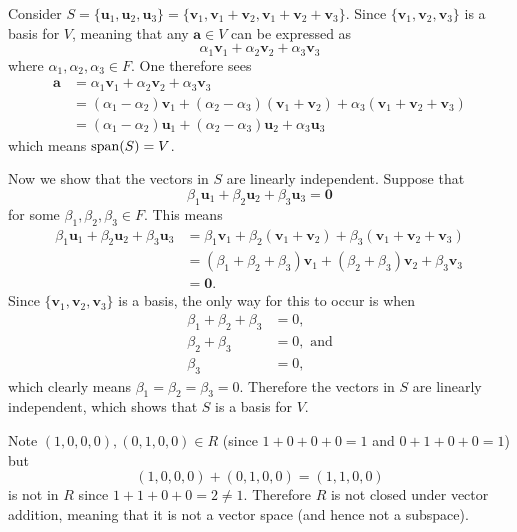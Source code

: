 \begin{questions}
    \item Consider $S = \{\mathbf{u}_1, \mathbf{u}_2, \mathbf{u}_3\} = \{\mathbf{v}_1, \mathbf{v}_1 + \mathbf{v}_2, \mathbf{v}_1 + \mathbf{v}_2 + \mathbf{v}_3\}$. Since $\{\mathbf{v}_1,\mathbf{v}_2,\mathbf{v}_3\}$ is a basis for $V$, meaning that any $\mathbf{a} \in V$ can be expressed as
    \[
        \alpha_1\mathbf{v}_1 + \alpha_2\mathbf{v}_2 + \alpha_3\mathbf{v}_3
    \]
    where $\alpha_1, \alpha_2, \alpha_3 \in F$. One therefore sees
    \begin{align*}
        \mathbf{a} &= \alpha_1\mathbf{v}_1 + \alpha_2\mathbf{v}_2 + \alpha_3\mathbf{v}_3\\
        &= (\alpha_1 - \alpha_2)\mathbf{v}_1 + (\alpha_2 - \alpha_3)(\mathbf{v}_1 + \mathbf{v}_2) + \alpha_3(\mathbf{v}_1 + \mathbf{v}_2 + \mathbf{v}_3)\\
        &= (\alpha_1 - \alpha_2)\mathbf{u}_1 + (\alpha_2 - \alpha_3)\mathbf{u}_2 + \alpha_3\mathbf{u}_3
    \end{align*}
    which means $\mathrm{span}(S) = V$.

    Now we show that the vectors in $S$ are linearly independent. Suppose that
    \[
        \beta_1\mathbf{u}_1 + \beta_2\mathbf{u}_2 + \beta_3\mathbf{u}_3 = \mathbf{0}
    \]
    for some $\beta_1, \beta_2, \beta_3 \in F$. This means
    \begin{align*}
        \beta_1\mathbf{u}_1 + \beta_2\mathbf{u}_2 + \beta_3\mathbf{u}_3 &= \beta_1\mathbf{v}_1 + \beta_2(\mathbf{v}_1 + \mathbf{v}_2) + \beta_3(\mathbf{v}_1 + \mathbf{v}_2 + \mathbf{v}_3)\\
        &= (\beta_1+\beta_2+\beta_3)\mathbf{v}_1 + (\beta_2+\beta_3)\mathbf{v}_2 + \beta_3\mathbf{v}_3\\
        &= \mathbf{0}.
    \end{align*}
    Since $\{\mathbf{v}_1, \mathbf{v}_2, \mathbf{v}_3\}$ is a basis, the only way for this to occur is when
    \begin{align*}
        \beta_1 + \beta_2 + \beta_3 &= 0,\\
        \beta_2 + \beta_3 &= 0, \text{ and}\\
        \beta_3 & = 0,
    \end{align*}
    which clearly means $\beta_1 = \beta_2 = \beta_3 = 0$. Therefore the vectors in $S$ are linearly independent, which shows that $S$ is a basis for $V$.

    \item \begin{partquestions}{\alph*}
        \item Note $(1, 0, 0, 0), (0, 1, 0, 0) \in R$ (since $1 + 0 + 0 + 0 = 1$ and $0 + 1 + 0 + 0 = 1$) but
        \[
            (1, 0, 0, 0) + (0, 1, 0, 0) = (1, 1, 0, 0)
        \]
        is not in $R$ since $1 + 1 + 0 + 0 = 2 \neq 1$. Therefore $R$ is not closed under vector addition, meaning that it is not a vector space (and hence not a subspace).


\end{partquestions}
\end{questions}
